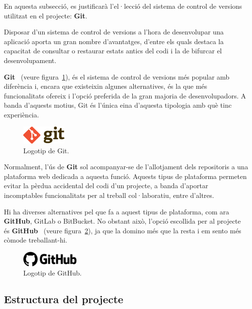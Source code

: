 \documentclass[a4paper,12pt]{ThesisStyle}
\begin{document}
En aquesta subsecció, es justificarà l'el·lecció del sistema de control de versions utilitzat en el projecte: \textbf{Git}.

Disposar d'un sistema de control de versions a l'hora de desenvolupar una aplicació aporta un gran nombre d'avantatges, d'entre els quals destaca la capacitat de consultar o restaurar estats antics del codi i la de bifurcar el desenvolupament.

\textbf{Git}~\cite{Git} (veure figura~\ref{img:logo_git}), és el sistema de control de versions més popular amb diferència i, encara que existeixin algunes alternatives, és la que més funcionalitats ofereix i l'opció preferida de la gran majoria de desenvolupadors. A banda d'aquests motius, Git és l'única eina d'aquesta tipologia amb què tinc experiència. 

\begin{figure}[H]
  \centering
  \includegraphics[width=0.2\textwidth]{assets/logos/Git.png}
  \caption{\label{img:logo_git}Logotip de Git.}
\end{figure}

Normalment, l'ús de \textbf{Git} sol acompanyar-se de l'allotjament dels repositoris a una plataforma web dedicada a aquesta funció. Aquests tipus de plataforma permeten evitar la pèrdua accidental del codi d'un projecte, a banda d'aportar incomptables funcionalitats per al treball col·laboratiu, entre d'altres.

Hi ha diverses alternatives pel que fa a aquest tipus de plataforma, com ara \textbf{GitHub}, GitLab o BitBucket. No obstant això, l'opció escollida per al projecte és \textbf{GitHub}~\cite{GitHub} (veure figura~\ref{img:logo_github}), ja que la domino més que la resta i em sento més còmode treballant-hi.

\begin{figure}[H]
  \centering
  \includegraphics[width=0.26\textwidth]{assets/logos/GitHub.png}
  \caption{\label{img:logo_github}Logotip de GitHub.}
\end{figure}

\subsection{Estructura del projecte}
\label{subsec:decisions_estructura_estructura}
\end{document}
